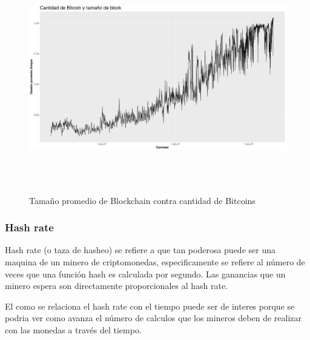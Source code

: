 \documentclass[12pt,letterpaper]{article}
\begin{document}
    \begin{figure}
        \centering

        \includegraphics[width = 18cm, height = 10cm]{btc/blockSize_vs_cantidad}

        \caption{Tama\~no promedio de Blockchain contra cantidad de Bitcoins}
    \end{figure}

    \subsubsection*{Hash rate}

    Hash rate (o taza de hasheo) se refiere a que tan poderosa puede ser una maquina de un minero de criptomonedas, especificamente se refiere al número de veces que una función hash es calculada por segundo. Las ganancias que un minero espera son directamente proporcionales al hash rate.

    El como se relaciona el hash rate con el tiempo puede ser de interes porque se podria ver como avanza el número de calculos que los mineros deben de realizar con las monedas a través del tiempo.
\end{document}
